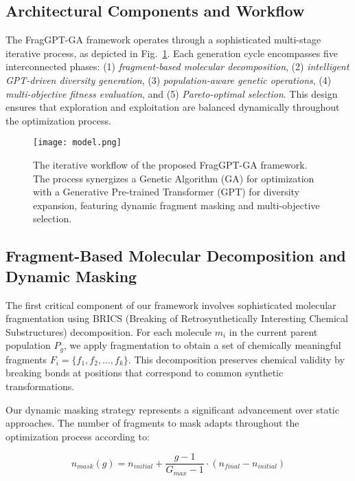 \documentclass[lettersize,journal]{IEEEtran}
\begin{document}
\subsection{Architectural Components and Workflow}

The FragGPT-GA framework operates through a sophisticated multi-stage iterative process, as depicted in Fig.~\ref{fig:flowchart}. Each generation cycle encompasses five interconnected phases: (1) \textit{fragment-based molecular decomposition}, (2) \textit{intelligent GPT-driven diversity generation}, (3) \textit{population-aware genetic operations}, (4) \textit{multi-objective fitness evaluation}, and (5) \textit{Pareto-optimal selection}. This design ensures that exploration and exploitation are balanced dynamically throughout the optimization process.

\begin{figure}[!t]
\centering
\texttt{[image: model.png]}
\caption{The iterative workflow of the proposed FragGPT-GA framework. The process synergizes a Genetic Algorithm (GA) for optimization with a Generative Pre-trained Transformer (GPT) for diversity expansion, featuring dynamic fragment masking and multi-objective selection.}
\label{fig:flowchart}
\end{figure}

\subsection{Fragment-Based Molecular Decomposition and Dynamic Masking}

The first critical component of our framework involves sophisticated molecular fragmentation using BRICS (Breaking of Retrosynthetically Interesting Chemical Substructures) decomposition. For each molecule $m_i$ in the current parent population $P_g$, we apply fragmentation to obtain a set of chemically meaningful fragments $F_i = \{f_1, f_2, \ldots, f_k\}$. This decomposition preserves chemical validity by breaking bonds at positions that correspond to common synthetic transformations.

Our dynamic masking strategy represents a significant advancement over static approaches. The number of fragments to mask adapts throughout the optimization process according to:

\begin{equation}
n_{mask}(g) = n_{initial} + \frac{g-1}{G_{max}-1} \cdot (n_{final} - n_{initial})
\end{equation}
\end{document}
